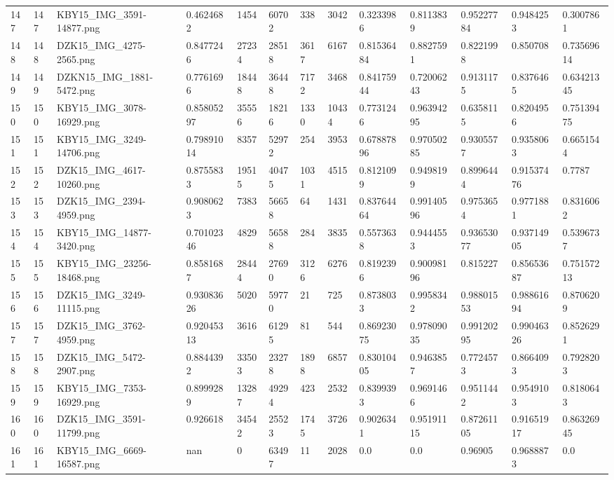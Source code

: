 \documentclass[11pt, a4paper, twoside]{report}
\begin{document}
\begin{longtable}[c]{@{}lllllllllllll@{}}
147 & 147 & KBY15\_IMG\_3591-14877.png & 0.4624682 & 1454 & 60702 & 338 & 3042 & 0.3233986 & 0.8113839 & 0.95227784 & 0.9484253 & 0.3007861 \\
148 & 148 & DZK15\_IMG\_4275-2565.png & 0.8477246 & 27234 & 28518 & 3617 & 6167 & 0.81536484 & 0.8827591 & 0.8221998 & 0.850708 & 0.73569614 \\
149 & 149 & DZKN15\_IMG\_1881-5472.png & 0.7761696 & 18448 & 36448 & 7172 & 3468 & 0.84175944 & 0.72006243 & 0.9131175 & 0.8376465 & 0.63421345 \\
150 & 150 & KBY15\_IMG\_3078-16929.png & 0.85805297 & 35556 & 18216 & 1330 & 10434 & 0.7731246 & 0.96394295 & 0.6358115 & 0.8204956 & 0.75139475 \\
151 & 151 & KBY15\_IMG\_3249-14706.png & 0.79891014 & 8357 & 52972 & 254 & 3953 & 0.67887896 & 0.97050285 & 0.9305577 & 0.9358063 & 0.6651544 \\
152 & 152 & DZK15\_IMG\_4617-10260.png & 0.8755833 & 19515 & 40475 & 1031 & 4515 & 0.8121099 & 0.9498199 & 0.8996444 & 0.91537476 & 0.7787 \\
153 & 153 & DZK15\_IMG\_2394-4959.png & 0.9080623 & 7383 & 56658 & 64 & 1431 & 0.83764464 & 0.99140596 & 0.9753654 & 0.9771881 & 0.8316062 \\
154 & 154 & KBY15\_IMG\_14877-3420.png & 0.70102346 & 4829 & 56588 & 284 & 3835 & 0.5573638 & 0.9444553 & 0.93653077 & 0.93714905 & 0.5396737 \\
155 & 155 & KBY15\_IMG\_23256-18468.png & 0.8581687 & 28444 & 27690 & 3126 & 6276 & 0.8192396 & 0.90098196 & 0.815227 & 0.85653687 & 0.75157213 \\
156 & 156 & DZK15\_IMG\_3249-11115.png & 0.93083626 & 5020 & 59770 & 21 & 725 & 0.8738033 & 0.9958342 & 0.98801553 & 0.98861694 & 0.8706209 \\
157 & 157 & DZK15\_IMG\_3762-4959.png & 0.92045313 & 3616 & 61295 & 81 & 544 & 0.86923075 & 0.97809035 & 0.99120295 & 0.99046326 & 0.8526291 \\
158 & 158 & DZK15\_IMG\_5472-2907.png & 0.8844392 & 33503 & 23278 & 1898 & 6857 & 0.83010405 & 0.9463857 & 0.7724573 & 0.8664093 & 0.7928203 \\
159 & 159 & KBY15\_IMG\_7353-16929.png & 0.8999289 & 13287 & 49294 & 423 & 2532 & 0.8399393 & 0.9691466 & 0.9511442 & 0.9549103 & 0.8180643 \\
160 & 160 & DZK15\_IMG\_3591-11799.png & 0.926618 & 34542 & 25523 & 1745 & 3726 & 0.9026341 & 0.95191115 & 0.87261105 & 0.91651917 & 0.86326945 \\
161 & 161 & KBY15\_IMG\_6669-16587.png & nan & 0 & 63497 & 11 & 2028 & 0.0 & 0.0 & 0.96905 & 0.9688873 & 0.0 \\

\end{longtable}
\end{document}
